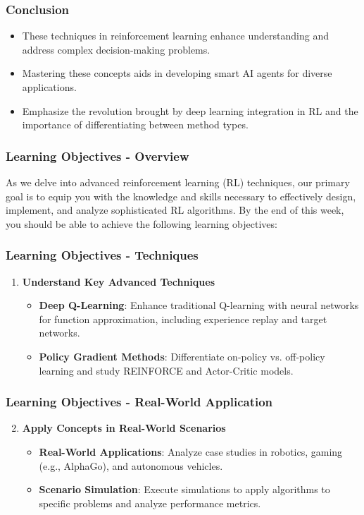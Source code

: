 \documentclass[aspectratio=169]{beamer}
\begin{document}
\begin{frame}[fragile]
    \frametitle{Conclusion}
    \begin{itemize}
        \item These techniques in reinforcement learning enhance understanding and address complex decision-making problems.
        \item Mastering these concepts aids in developing smart AI agents for diverse applications.
        \item Emphasize the revolution brought by deep learning integration in RL and the importance of differentiating between method types.
    \end{itemize}
\end{frame}

\begin{frame}[fragile]
    \frametitle{Learning Objectives - Overview}
    As we delve into advanced reinforcement learning (RL) techniques, our primary goal is to equip you with the knowledge and skills necessary to effectively design, implement, and analyze sophisticated RL algorithms. By the end of this week, you should be able to achieve the following learning objectives:
\end{frame}

\begin{frame}[fragile]
    \frametitle{Learning Objectives - Techniques}
    \begin{enumerate}
        \item \textbf{Understand Key Advanced Techniques}
        \begin{itemize}
            \item \textbf{Deep Q-Learning}: Enhance traditional Q-learning with neural networks for function approximation, including experience replay and target networks.
            \item \textbf{Policy Gradient Methods}: Differentiate on-policy vs. off-policy learning and study REINFORCE and Actor-Critic models.
        \end{itemize}
    \end{enumerate}
\end{frame}

\begin{frame}[fragile]
    \frametitle{Learning Objectives - Real-World Application}
    \begin{enumerate}
        \setcounter{enumi}{1}
        \item \textbf{Apply Concepts in Real-World Scenarios}
        \begin{itemize}
            \item \textbf{Real-World Applications}: Analyze case studies in robotics, gaming (e.g., AlphaGo), and autonomous vehicles.
            \item \textbf{Scenario Simulation}: Execute simulations to apply algorithms to specific problems and analyze performance metrics.
        \end{itemize}
    \end{enumerate}
\end{frame}
\end{document}
